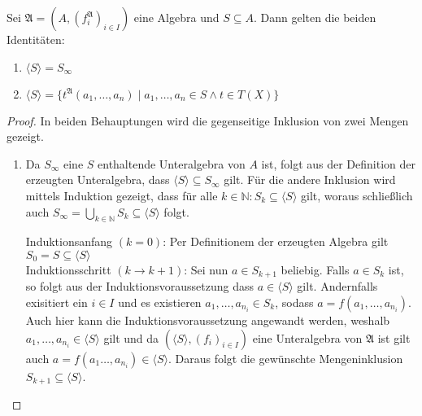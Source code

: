 \begin{proposition}
    Sei $\mathfrak{A}=(A,(f^\mathfrak{A}_i)_{i\in I})$ eine Algebra und $S\subseteq A$. Dann gelten die beiden Identitäten:
    \begin{enumerate}
        \item $\langle S\rangle=S_\infty$
        \item $\langle S\rangle=\{t^\mathfrak{A}(a_1,\ldots,a_n) \mid a_1,\ldots,a_n\in S\land t\in T(X)\}$
    \end{enumerate}
\end{proposition}
\begin{proof} In beiden Behauptungen wird die gegenseitige Inklusion von zwei Mengen gezeigt.
    \begin{enumerate}
        \item Da $S_\infty$ eine $S$ enthaltende Unteralgebra von $A$ ist, folgt aus der Definition der
        erzeugten Unteralgebra, dass $\langle S\rangle\subseteq S_\infty$ gilt.
        Für die andere Inklusion wird mittels Induktion gezeigt, dass für alle $k\in\mathbb{N}:S_k\subseteq \langle S\rangle$ gilt,
        woraus schließlich auch $S_\infty=\bigcup_{k\in\mathbb{N}}S_k\subseteq \langle S\rangle$ folgt.

        Induktionsanfang $(k=0)$: Per Definitionem der erzeugten Algebra gilt $S_0=S\subseteq \langle S\rangle$\\
        Induktionsschritt $(k\to k+1)$: Sei nun $a\in S_{k+1}$ beliebig. Falls $a\in S_k$ ist, so folgt aus
        der Induktionsvoraussetzung dass $a\in \langle S\rangle$ gilt. Andernfalls exisitiert ein $i\in I$ und
        es existieren $a_1,\ldots,a_{n_i}\in S_{k}$, sodass $a=f(a_1,\ldots,a_{n_i})$. Auch hier kann die Induktionsvoraussetzung
        angewandt werden, weshalb $a_1,\ldots,a_{n_i}\in \langle S\rangle$ gilt und da $(\langle S\rangle,(f_i)_{i\in I})$ eine Unteralgebra
        von $\mathfrak{A}$ ist gilt auch $a=f(a_1\ldots,a_{n_i})\in\langle S\rangle$. Daraus folgt die gewünschte Mengeninklusion
        $S_{k+1}\subseteq \langle S\rangle$.


\end{enumerate}
\end{proof}
